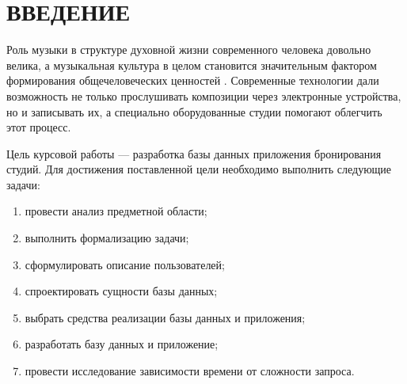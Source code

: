 \chapter*{ВВЕДЕНИЕ}
Роль музыки в структуре духовной жизни современного человека довольно велика, а музыкальная культура в целом становится значительным фактором формирования общечеловеческих ценностей \cite{music_for_youth}.
Современные технологии дали возможность не только прослушивать композиции через электронные устройства, но и записывать их, а специально оборудованные студии помогают облегчить этот процесс.

Цель курсовой работы --- разработка базы данных приложения бронирования студий.
Для достижения поставленной цели необходимо выполнить следующие задачи:

\begin{enumerate}
	\item провести анализ предметной области;
	\item выполнить формализацию задачи;
	\item сформулировать описание пользователей;
	\item спроектировать сущности базы данных;
	\item выбрать средства реализации базы данных и приложения;
	\item разработать базу данных и приложение;
	\item провести исследование зависимости времени от сложности запроса.
\end{enumerate}